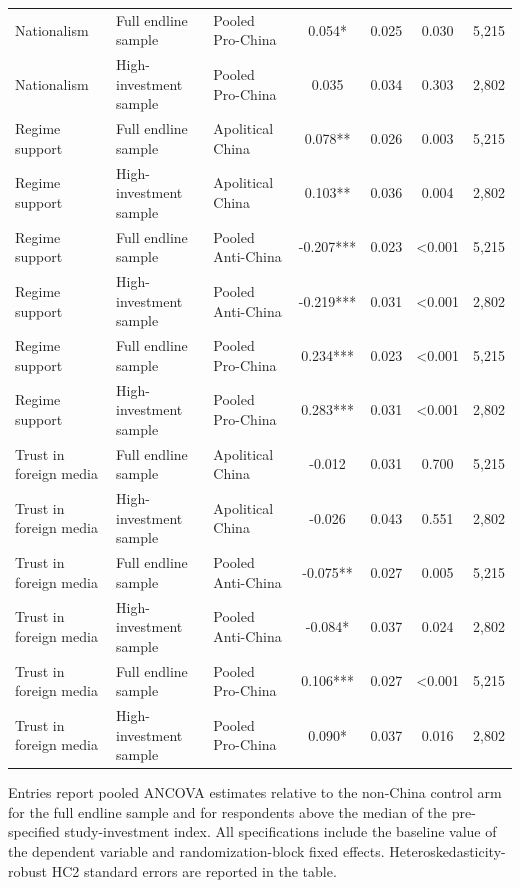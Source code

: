 \begin{table}[H]
\begin{threeparttable}
\begin{tabular}{lllcccc}
Nationalism & Full endline sample & Pooled Pro-China & 0.054* & 0.025 & 0.030 & 5,215 \\
Nationalism & High-investment sample & Pooled Pro-China & 0.035 & 0.034 & 0.303 & 2,802 \\
Regime support & Full endline sample & Apolitical China & 0.078** & 0.026 & 0.003 & 5,215 \\
Regime support & High-investment sample & Apolitical China & 0.103** & 0.036 & 0.004 & 2,802 \\
Regime support & Full endline sample & Pooled Anti-China & -0.207*** & 0.023 & <0.001 & 5,215 \\
Regime support & High-investment sample & Pooled Anti-China & -0.219*** & 0.031 & <0.001 & 2,802 \\
Regime support & Full endline sample & Pooled Pro-China & 0.234*** & 0.023 & <0.001 & 5,215 \\
Regime support & High-investment sample & Pooled Pro-China & 0.283*** & 0.031 & <0.001 & 2,802 \\
Trust in foreign media & Full endline sample & Apolitical China & -0.012 & 0.031 & 0.700 & 5,215 \\
Trust in foreign media & High-investment sample & Apolitical China & -0.026 & 0.043 & 0.551 & 2,802 \\
Trust in foreign media & Full endline sample & Pooled Anti-China & -0.075** & 0.027 & 0.005 & 5,215 \\
Trust in foreign media & High-investment sample & Pooled Anti-China & -0.084* & 0.037 & 0.024 & 2,802 \\
Trust in foreign media & Full endline sample & Pooled Pro-China & 0.106*** & 0.027 & <0.001 & 5,215 \\
Trust in foreign media & High-investment sample & Pooled Pro-China & 0.090* & 0.037 & 0.016 & 2,802 \\
\bottomrule
\end{tabular}
\begin{tablenotes}[flushleft]
\footnotesize
\item Entries report pooled ANCOVA estimates relative to the non-China control arm for the full endline sample and for respondents above the median of the pre-specified study-investment index. All specifications include the baseline value of the dependent variable and randomization-block fixed effects. Heteroskedasticity-robust HC2 standard errors are reported in the table.
\end{tablenotes}
\end{threeparttable}
\end{table}
